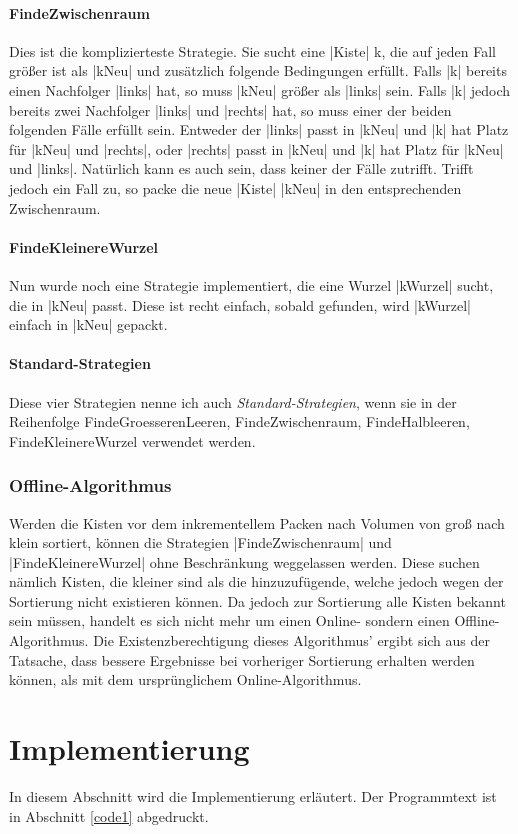 \paragraph{FindeZwischenraum}
 Dies ist die komplizierteste Strategie. Sie sucht eine |Kiste| k, die auf jeden Fall größer ist als |kNeu| und zusätzlich folgende Bedingungen erfüllt.
 Falls |k| bereits einen Nachfolger |links| hat, so muss |kNeu| größer als |links| sein.
 Falls |k| jedoch bereits zwei Nachfolger |links| und |rechts| hat, so muss einer der beiden folgenden Fälle erfüllt sein.
  Entweder der |links|  passt in |kNeu| und |k| hat Platz für |kNeu| und |rechts|,
          oder |rechts| passt in |kNeu| und |k| hat Platz für |kNeu| und |links|.
 Natürlich kann es auch sein, dass keiner der Fälle zutrifft. Trifft jedoch ein Fall zu, so packe die neue |Kiste| |kNeu| in den entsprechenden Zwischenraum.
\paragraph{FindeKleinereWurzel}
 Nun wurde noch eine Strategie implementiert, die eine Wurzel |kWurzel| sucht, die in |kNeu| passt.
 Diese ist recht einfach, sobald gefunden, wird |kWurzel| einfach in |kNeu| gepackt.
\paragraph{Standard-Strategien}
 Diese vier Strategien nenne ich auch \emph{Standard-Strategien}, wenn sie in der Reihenfolge FindeGroesserenLeeren, FindeZwischenraum, FindeHalbleeren, FindeKleinereWurzel verwendet werden.
\subsubsection{Offline-Algorithmus}
 Werden die Kisten vor dem inkrementellem Packen nach Volumen von groß nach klein sortiert,
  können die Strategien |FindeZwischenraum| und |FindeKleinereWurzel| ohne Beschränkung weggelassen werden.
 Diese suchen nämlich Kisten, die kleiner sind als die hinzuzufügende, welche jedoch wegen der Sortierung nicht existieren können.
 Da jedoch zur Sortierung alle Kisten bekannt sein müssen, handelt es sich nicht mehr um einen Online- sondern einen Offline-Algorithmus.
 Die Existenzberechtigung dieses Algorithmus' ergibt sich aus der Tatsache, dass bessere Ergebnisse bei vorheriger Sortierung erhalten werden können,
  als mit dem ursprünglichem Online-Algorithmus.
\clearpage

\section{Implementierung}
\lstset{basicstyle=\ttfamily}
 In diesem Abschnitt wird die Implementierung erläutert. Der Programmtext ist in Abschnitt \ref{code1} abgedruckt.

